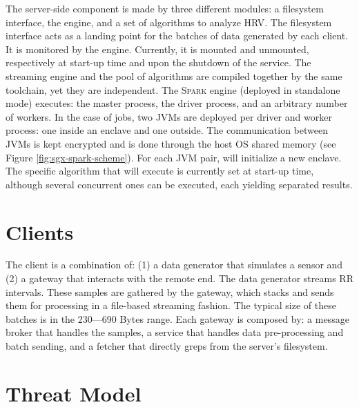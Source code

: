 The server-side component is made by three different modules: a filesystem interface, the \sgxspark engine, and a set of algorithms to analyze HRV. 
The filesystem interface acts as a landing point for the batches of data generated by each client. 
It is monitored by the \sgxspark engine.
Currently, it is mounted and unmounted, respectively at start-up time and upon the shutdown of the service. 
The streaming engine and the pool of algorithms are compiled together by the same toolchain, yet they are independent. 
The \textsc{Spark} engine (deployed in standalone mode) executes: the master process, the driver process, and an arbitrary number of workers. 
In the case of \sgxspark jobs, two JVMs are deployed per driver and worker process: one inside an enclave and one outside.
The communication between JVMs is kept encrypted and is done through the host OS shared memory (see Figure \ref{fig:sgx-spark-scheme}).
For each JVM pair, \sgxspark will initialize a new enclave.
The specific algorithm that \projName will execute is currently set at start-up time, although several concurrent ones can be executed, each yielding separated results. 

\section{Clients} \label{sec:clients}

The client is a combination of: (1) a data generator that simulates a sensor and (2) a gateway that interacts with the remote end. 
The data generator streams RR intervals. %
These samples are gathered by the gateway, which stacks and sends them for processing in a file-based streaming fashion. 
The typical size of these batches is in the 230---690 Bytes range.
Each gateway is composed by: a message broker that handles the samples, a service that handles data pre-processing and batch sending, and a fetcher that directly greps from the server's filesystem.

\section{Threat Model} \label{sec:threat}

